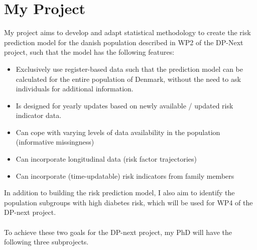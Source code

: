 \documentclass[11pt]{article}
\begin{document}
\section{My Project}
\label{sec:org1f29bc1}
My project aims to develop and adapt statistical methodology to create the risk prediction model for the danish population described in WP2 of the DP-Next project, such that the model has the following features:

\begin{itemize}
\item Exclusively use register-based data such that the prediction model can be calculated for the entire population of Denmark, without the need to ask individuals for additional information.
\item Is designed for yearly updates based on newly available / updated risk indicator data.
\item Can cope with varying levels of data availability in the population (informative missingness)
\item Can incorporate longitudinal data (risk factor trajectories)
\item Can incorporate (time-updatable) risk indicators from family members
\end{itemize}

In addition to building the risk prediction model, I also aim to identify the population subgroups with
high diabetes risk, which will be used for WP4 of the DP-next project.\\[0pt]
\\[0pt]
To achieve these two goals for the DP-next project, my PhD will have the following three subprojects.
\end{document}
